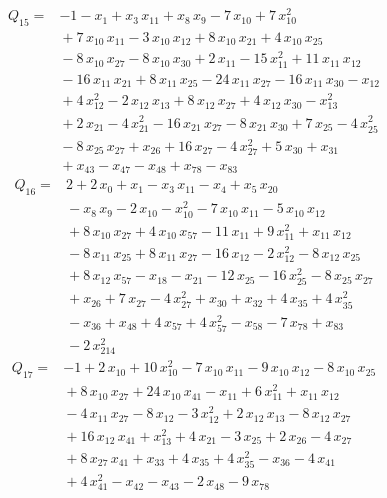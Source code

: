 \documentclass[11pt]{article}
\theoremstyle{definition}\newtheorem{definition}[theorem]{Definition}
\begin{document}
\begin{align*}
Q_{15}={}&-1-x_{1}+x_{3}\,x_{11}+x_{8}\,x_{9}-7\,x_{10}+7\,x_{10}^{2}
\\ &{}+7\,x_{10}\,x_{11}-3\,x_{10}\,x_{12}+8\,x_{10}\,x_{21}+4\,x_{10}\,x_{25}
\\ &{}-8\,x_{10}\,x_{27}-8\,x_{10}\,x_{30}+2\,x_{11}-15\,x_{11}^{2}+11\,x_{11}\,x_{12}
\\ &{}-16\,x_{11}\,x_{21}+8\,x_{11}\,x_{25}-24\,x_{11}\,x_{27}-16\,x_{11}\,x_{30}-x_{12}
\\ &{}+4\,x_{12}^{2}-2\,x_{12}\,x_{13}+8\,x_{12}\,x_{27}+4\,x_{12}\,x_{30}-x_{13}^{2}
\\ &{}+2\,x_{21}-4\,x_{21}^{2}-16\,x_{21}\,x_{27}-8\,x_{21}\,x_{30}+7\,x_{25}-4\,x_{25}^{2}
\\ &{}-8\,x_{25}\,x_{27}+x_{26}+16\,x_{27}-4\,x_{27}^{2}+5\,x_{30}+x_{31}
\\ &{}+x_{43}-x_{47}-x_{48}+x_{78}-x_{83}
\end{align*}
\begin{align*}
Q_{16}={}&2+2\,x_{0}+x_{1}-x_{3}\,x_{11}-x_{4}+x_{5}\,x_{20}
\\ &{}-x_{8}\,x_{9}-2\,x_{10}-x_{10}^{2}-7\,x_{10}\,x_{11}-5\,x_{10}\,x_{12}
\\ &{}+8\,x_{10}\,x_{27}+4\,x_{10}\,x_{57}-11\,x_{11}+9\,x_{11}^{2}+x_{11}\,x_{12}
\\ &{}-8\,x_{11}\,x_{25}+8\,x_{11}\,x_{27}-16\,x_{12}-2\,x_{12}^{2}-8\,x_{12}\,x_{25}
\\ &{}+8\,x_{12}\,x_{57}-x_{18}-x_{21}-12\,x_{25}-16\,x_{25}^{2}-8\,x_{25}\,x_{27}
\\ &{}+x_{26}+7\,x_{27}-4\,x_{27}^{2}+x_{30}+x_{32}+4\,x_{35}+4\,x_{35}^{2}
\\ &{}-x_{36}+x_{48}+4\,x_{57}+4\,x_{57}^{2}-x_{58}-7\,x_{78}+x_{83}
\\ &{}-2\,x_{214}^{2}
\end{align*}
\begin{align*}
Q_{17}={}&-1+2\,x_{10}+10\,x_{10}^{2}-7\,x_{10}\,x_{11}-9\,x_{10}\,x_{12}-8\,x_{10}\,x_{25}
\\ &{}+8\,x_{10}\,x_{27}+24\,x_{10}\,x_{41}-x_{11}+6\,x_{11}^{2}+x_{11}\,x_{12}
\\ &{}-4\,x_{11}\,x_{27}-8\,x_{12}-3\,x_{12}^{2}+2\,x_{12}\,x_{13}-8\,x_{12}\,x_{27}
\\ &{}+16\,x_{12}\,x_{41}+x_{13}^{2}+4\,x_{21}-3\,x_{25}+2\,x_{26}-4\,x_{27}
\\ &{}+8\,x_{27}\,x_{41}+x_{33}+4\,x_{35}+4\,x_{35}^{2}-x_{36}-4\,x_{41}
\\ &{}+4\,x_{41}^{2}-x_{42}-x_{43}-2\,x_{48}-9\,x_{78}
\end{align*}
\end{document}
